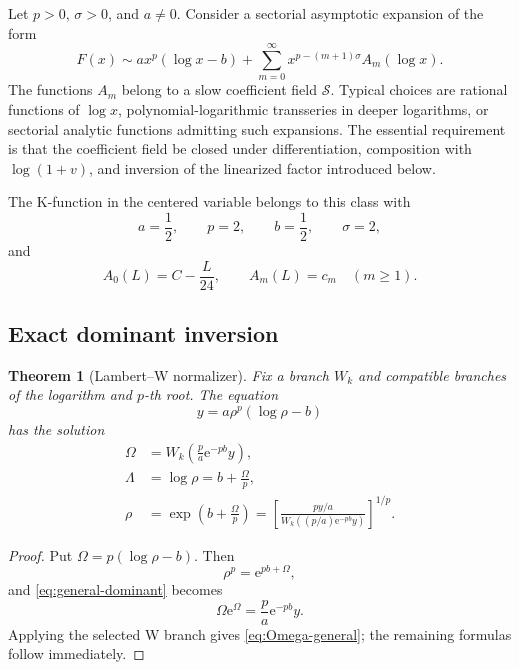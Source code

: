 \documentclass[11pt,a4paper]{article}
\numberwithin{equation}{section}
\newtheorem{theorem}{Theorem}[section]
\theoremstyle{remark}
\newcommand{\e}{\mathrm e}
\begin{document}
Let \(p>0\), \(\sigma>0\), and \(a\ne0\).  Consider a sectorial asymptotic
expansion of the form
\begin{equation}
F(x)\sim a x^p(\log x-b)
+\sum_{m=0}^{\infty}
 x^{p-(m+1)\sigma}A_m(\log x).
\label{eq:general-class}
\end{equation}
The functions \(A_m\) belong to a slow coefficient field \(\mathscr S\).
Typical choices are rational functions of \(\log x\), polynomial-logarithmic
transseries in deeper logarithms, or sectorial analytic functions admitting
such expansions.  The essential requirement is that the coefficient field
be closed under differentiation, composition with \(\log(1+v)\), and
inversion of the linearized factor introduced below.

The K-function in the centered variable belongs to this class with
\begin{equation}
 a=\frac12,
 \qquad p=2,
 \qquad b=\frac12,
 \qquad \sigma=2,
\label{eq:K-general-parameters}
\end{equation}
and
\[
A_0(L)=C-\frac{L}{24},
\qquad A_m(L)=c_m\quad(m\ge1).
\]

\subsection{Exact dominant inversion}

\begin{theorem}[Lambert--W normalizer]
\label{thm:general-W-normalizer}
Fix a branch \(W_k\) and compatible branches of the logarithm and
\(p\)-th root.  The equation
\begin{equation}
y=a\rho^p(\log\rho-b)
\label{eq:general-dominant}
\end{equation}
has the solution
\begin{align}
\Omega&=W_k\!\left(\frac{p}{a}\e^{-pb}y\right),
\label{eq:Omega-general}\\
\Lambda&=\log\rho=b+\frac{\Omega}{p},
\label{eq:Lambda-general}\\
\rho&=\exp\!\left(b+\frac{\Omega}{p}\right)
=\left[
\frac{py/a}{W_k((p/a)\e^{-pb}y)}
\right]^{1/p}.
\label{eq:rho-general}
\end{align}
\end{theorem}

\begin{proof}
Put \(\Omega=p(\log\rho-b)\).  Then
\[
\rho^p=\e^{pb+\Omega},
\]
and \cref{eq:general-dominant} becomes
\[
\Omega\e^\Omega=\frac{p}{a}\e^{-pb}y.
\]
Applying the selected W branch gives \cref{eq:Omega-general}; the remaining
formulas follow immediately.
\end{proof}
\end{document}

